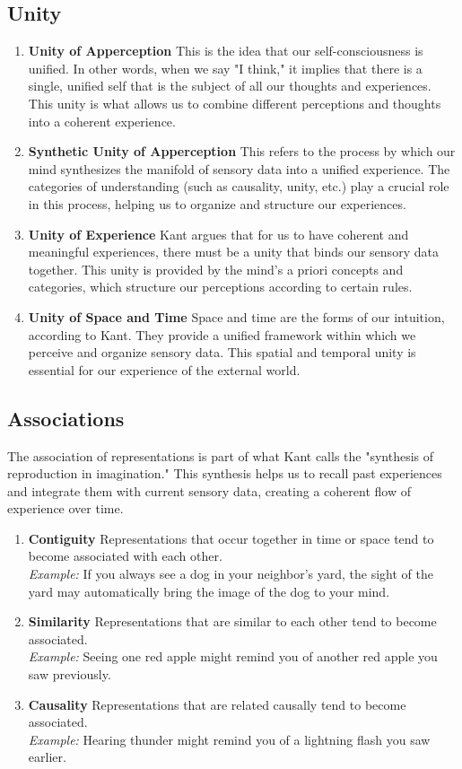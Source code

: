 \documentclass[a4paper]{article}
\begin{document}
\subsection{Unity}
\begin{enumerate}
    \item \textbf{Unity of Apperception} This is the idea that our self-consciousness is unified. 
    In other words, when we say "I think," it implies that there is a single, unified self that is the subject of all our thoughts and experiences. 
    This unity is what allows us to combine different perceptions and thoughts into a coherent experience.
    \item \textbf{Synthetic Unity of Apperception} This refers to the process by which our mind synthesizes the manifold of sensory data into a unified experience. 
    The categories of understanding (such as causality, unity, etc.) play a crucial role in this process, helping us to organize and structure our experiences.
    \item \textbf{Unity of Experience} Kant argues that for us to have coherent and meaningful experiences, there must be a unity that binds our sensory data together. 
    This unity is provided by the mind's a priori concepts and categories, which structure our perceptions according to certain rules.
    \item \textbf{Unity of Space and Time} Space and time are the forms of our intuition, according to Kant. 
    They provide a unified framework within which we perceive and organize sensory data. 
    This spatial and temporal unity is essential for our experience of the external world.
\end{enumerate}

\subsection{Associations}
The association of representations is part of what Kant calls the "synthesis of reproduction in imagination." 
This synthesis helps us to recall past experiences and integrate them with current sensory data, creating a coherent flow of experience over time.


\begin{enumerate}
    \item \textbf{Contiguity} Representations that occur together in time or space tend to become associated with each other. \\
    \textit{Example:} If you always see a dog in your neighbor's yard, the sight of the yard may automatically bring the image of the dog to your mind.
    \item \textbf{Similarity} Representations that are similar to each other tend to become associated. \\
    \textit{Example:} Seeing one red apple might remind you of another red apple you saw previously.
    \item \textbf{Causality} Representations that are related causally tend to become associated. \\
    \textit{Example:} Hearing thunder might remind you of a lightning flash you saw earlier.
\end{enumerate}
\end{document}
